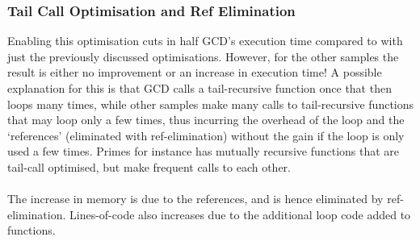 \subsubsection{Tail Call Optimisation and Ref Elimination}
Enabling this optimisation cuts in half GCD's execution time compared to with just the previously discussed optimisations. However, for the other samples the result is either no improvement or an increase in execution time! A possible explanation for this is that GCD calls a tail-recursive function once that then loops many times, while other samples make many calls to tail-recursive functions that may loop only a few times, thus incurring the overhead of the loop and the `references' (eliminated with ref-elimination) without the gain if the loop is only used a few times. Primes for instance has mutually recursive functions that are tail-call optimised, but make frequent calls to each other.
\\\\
The increase in memory is due to the references, and is hence eliminated by ref-elimination. Lines-of-code also increases due to the additional loop code added to functions.



